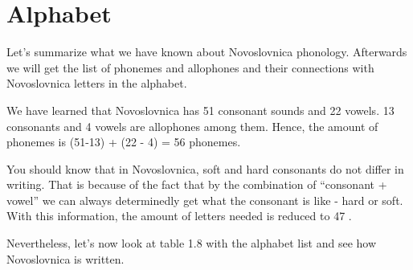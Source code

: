 \section{Alphabet}

Let’s summarize what we have known about Novoslovnica phonology. Afterwards we will get the list of phonemes and allophones and their connections with Novoslovnica letters in the alphabet.

We have learned that Novoslovnica has 51 consonant sounds and 22 vowels. 13 consonants and 4 vowels are allophones among them. Hence, the amount of phonemes is (51-13) + (22 - 4) = 56 phonemes.

You should know that in Novoslovnica, soft and hard consonants do not differ in writing. That is because of the fact that by the combination of “consonant + vowel” we can always determinedly get what the consonant is like - hard or soft. With this information, the amount of letters needed is reduced to 47 \cite{nsl-alphabet}.

Nevertheless, let’s now look at table 1.8 with the alphabet list and see how Novoslovnica is written.

